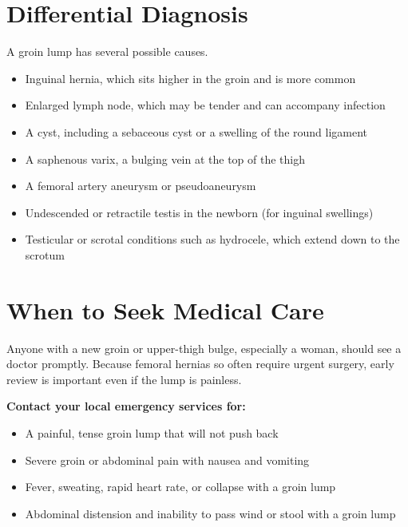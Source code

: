 \section*{Differential Diagnosis}
A groin lump has several possible causes.
\begin{itemize}
    \item Inguinal hernia, which sits higher in the groin and is more common
    \item Enlarged lymph node, which may be tender and can accompany infection
    \item A cyst, including a sebaceous cyst or a swelling of the round ligament
    \item A saphenous varix, a bulging vein at the top of the thigh
    \item A femoral artery aneurysm or pseudoaneurysm
    \item Undescended or retractile testis in the newborn (for inguinal swellings)
    \item Testicular or scrotal conditions such as hydrocele, which extend down to the scrotum
\end{itemize}

\section*{When to Seek Medical Care}
Anyone with a new groin or upper-thigh bulge, especially a woman, should see a doctor promptly. Because femoral hernias so often require urgent surgery, early review is important even if the lump is painless.

\textbf{Contact your local emergency services for:}
\begin{itemize}
    \item A painful, tense groin lump that will not push back
    \item Severe groin or abdominal pain with nausea and vomiting
    \item Fever, sweating, rapid heart rate, or collapse with a groin lump
    \item Abdominal distension and inability to pass wind or stool with a groin lump
\end{itemize}

